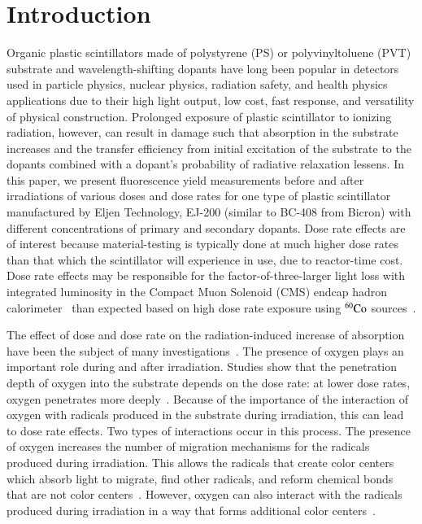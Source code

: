 \documentclass[review]{elsarticle}
\begin{document}

\section{Introduction}
Organic plastic scintillators made of polystyrene (PS) or polyvinyltoluene (PVT) substrate and wavelength-shifting dopants have 
long been popular in detectors used in particle physics, nuclear physics, radiation safety, and health physics applications 
due to their high light output, low cost, fast response, and versatility of physical construction. 
Prolonged exposure of plastic scintillator to ionizing radiation, however, can result in damage such that
absorption in the substrate increases and the transfer efficiency from initial excitation of the substrate to the dopants
combined with a dopant's probability of radiative relaxation lessens. 
In this paper, we present fluorescence yield measurements before and after irradiations of various doses and 
dose rates for one type of plastic scintillator manufactured by Eljen Technology, EJ-200 (similar to BC-408 from Bicron) 
with different concentrations of primary and secondary dopants.
Dose rate effects are of interest because material-testing is typically done at much higher dose rates than 
that which the scintillator will experience in use, due to reactor-time cost.
Dose rate effects may be responsible for the factor-of-three-larger light loss with integrated luminosity 
in the Compact Muon Solenoid (CMS) endcap hadron calorimeter~\cite{phaseiitdr,ecfa2015} than expected based on high dose rate exposure 
using $\rm {^{60}Co}$ sources~\cite{vasken,ByonWagner1993263}. 

The effect of dose and dose rate on the radiation-induced increase of absorption have been the subject of many investigations~\cite{sauli}.
The presence of oxygen plays an important role during and after irradiation.
Studies show that the penetration depth of oxygen into the substrate depends on the dose rate: 
at lower dose rates, oxygen penetrates more deeply~\cite{sauli,Wick1991472,Wick2001341}. 
Because of the importance of the interaction of oxygen with radicals produced in the substrate during irradiation, 
this can lead to dose rate effects. Two types of interactions occur in this process. 
The presence of oxygen increases the number of migration mechanisms for the radicals produced during irradiation. 
This allows the radicals that create color centers which absorb light to migrate, find other radicals, 
and reform chemical bonds that are not color centers~\cite{Wulkop1995141}.
However, oxygen can also interact with the radicals produced during irradiation in a way 
that forms additional color centers~\cite{bross19921199}. 
\end{document}
